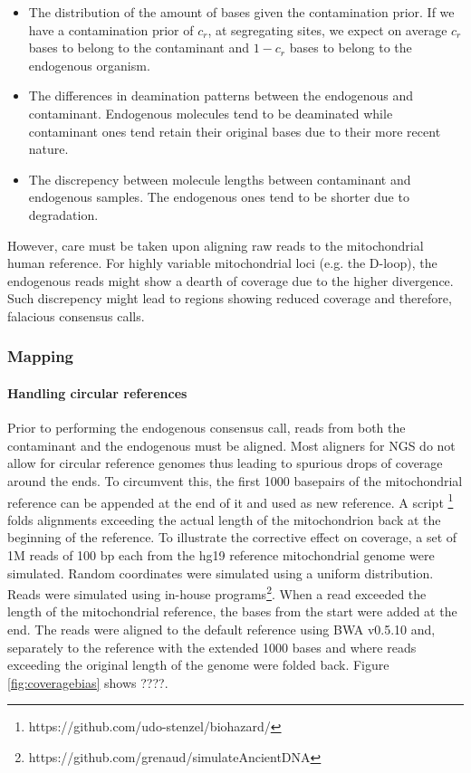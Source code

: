 \documentclass[a4paper,12pt]{article}
\begin{document}
\begin{itemize}
\item The distribution of the amount of bases given the contamination prior. If we have a contamination prior of $c_r$, at segregating sites, we expect on average $c_r$ bases to belong to the contaminant and $1-c_r$ bases to belong to the endogenous organism.
\item The differences in deamination patterns between the endogenous and contaminant. Endogenous molecules tend to be deaminated while contaminant ones tend retain their original bases due to their more recent nature. 
\item The discrepency between molecule lengths between contaminant and endogenous samples. The endogenous ones tend to be shorter due to degradation.
\end{itemize}

However, care must be taken upon aligning raw reads to the mitochondrial human reference. For highly variable mitochondrial loci (e.g. the D-loop), the endogenous reads might show a dearth of coverage due to the higher divergence. Such discrepency might lead to regions showing reduced coverage and therefore, falacious consensus calls.








\afterpage{\clearpage}



\subsubsection{Mapping}

\paragraph{Handling circular references}

Prior to performing the endogenous consensus call, reads from both the contaminant and the endogenous must be aligned. Most aligners for NGS do not allow for circular reference genomes thus leading to spurious drops of coverage around the ends. To circumvent this, the first 1000 basepairs  of the mitochondrial reference can be appended at the end of it and used as new reference. A script \footnote{https://github.com/udo-stenzel/biohazard/} folds alignments exceeding the actual length of the mitochondrion back at the beginning of the reference. To illustrate the corrective effect on coverage, a set of 1M reads of 100 bp each from the hg19 reference mitochondrial genome were simulated. Random coordinates were simulated using a uniform distribution. Reads were simulated using in-house programs\footnote{https://github.com/grenaud/simulateAncientDNA}. When a read exceeded the length of the mitochondrial reference, the bases from the start were added at the end. The reads were aligned to the default reference using BWA v0.5.10\cite{li2009fast} and, separately to the reference with the extended 1000 bases and where reads exceeding the original length of the genome were folded back. Figure \ref{fig:coveragebias} shows ????.
\end{document}
